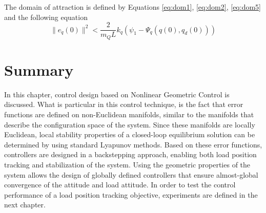 The domain of attraction is defined by Equations \ref{eq:dom1}, \ref{eq:dom2}, \ref{eq:dom5} and the following equation
\begin{equation}
\parallel e_{\dot{q}}(0)\parallel^2<\frac{2}{m_QL}{k_q}(\psi_1-\Psi_q(q(0),q_d(0)))
\end{equation}

%
%
%
%
%
%
%
%
%
%
%


\section*{Summary}
In this chapter, control design based on Nonlinear Geometric Control is discussed.
What is particular in this control technique, is the fact that error functions are defined on non-Euclidean manifolds, similar to the manifolds that describe the configuration space of the system.
Since these manifolds are locally Euclidean, local stability properties of a closed-loop equilibrium solution can be determined by using standard Lyapunov methods. 
Based on these error functions, controllers are designed in a backstepping approach, enabling both load position tracking and stabilization of the system.
Using the geometric properties of the system allows the design of globally defined controllers that ensure almost-global convergence of the  attitude and load attitude.
In order to test the control performance of a load position tracking objective, experiments are defined in the next chapter. 








